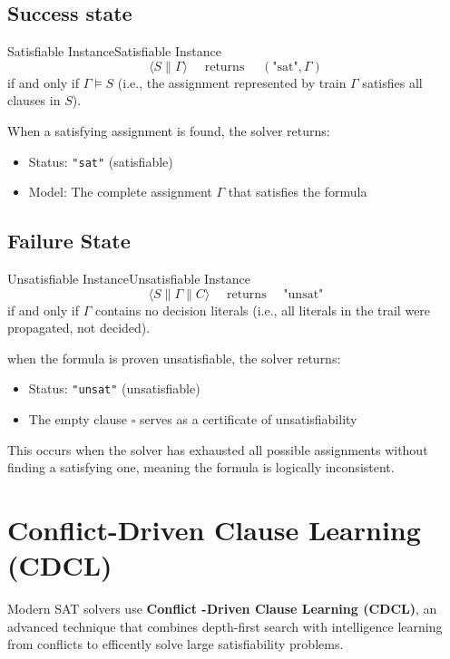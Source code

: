 \documentclass[a4paper]{article}
\theoremstyle{definition}
\begin{document}
\subsection{Success state}
\begin{definition}{Satisfiable Instance}{Satisfiable Instance}
\[
  \langle S \parallel \varGamma \rangle \quad \text{ returns } \quad (\text{"sat"}, \varGamma)
\]
if and only if \( \varGamma \models S \) (i.e., the assignment represented by train $\varGamma$ satisfies all clauses in $S$).
\end{definition} 
When a satisfying assignment is found, the solver returns:
\begin{itemize}
    \item Status: \texttt{"sat"} (satisfiable)
    \item Model: The complete assignment \( \varGamma \) that satisfies the formula
\end{itemize}
\subsection{Failure State}
\begin{definition}{Unsatisfiable Instance}{Unsatisfiable Instance}
\[
  \langle S \parallel \varGamma \parallel C \rangle \quad \text{ returns } \quad \text{"unsat"}
\]
if and only if \( \varGamma \) contains no decision literals (i.e., all literals in the trail were propagated, not decided).
\end{definition}
when the formula is proven unsatisfiable, the solver returns:
\begin{itemize}
    \item Status: \texttt{"unsat"} (unsatisfiable)
    \item The empty clause \( \square \) serves as a certificate of unsatisfiability
\end{itemize}
This occurs when the solver has exhausted all possible assignments without finding a satisfying one, meaning the formula 
is logically inconsistent.
\section{Conflict-Driven Clause Learning (CDCL)}
Modern SAT solvers use \textbf{Conflict -Driven Clause Learning (CDCL)}, an advanced 
technique that combines depth-first search with intelligence learning from conflicts 
to efficently solve large satisfiability problems.
\end{document}
